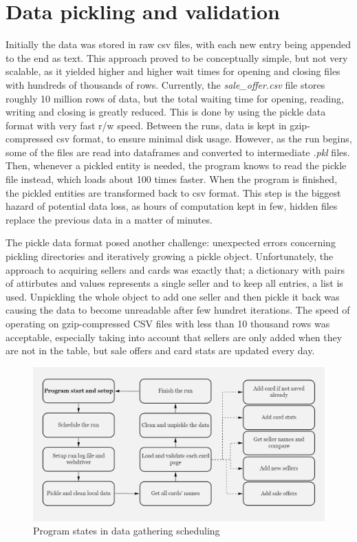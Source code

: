 \section{Data pickling and validation}
Initially the data was stored in raw csv files, with each new entry being appended to the end as text. This approach proved to be conceptually simple, but not very scalable, as it yielded higher and higher wait times for opening and closing files with hundreds of thousands of rows. Currently, the \textit{sale\_offer.csv} file stores roughly 10 million rows of data, but the total waiting time for opening, reading, writing and closing is greatly reduced. This is done by using the pickle data format with very fast r/w speed. Between the runs, data is kept in gzip-compressed csv format, to ensure minimal disk usage. However, as the run begins, some of the files are read into dataframes and converted to intermediate \textit{.pkl} files. Then, whenever a pickled entity is needed, the program knows to read the pickle file instead, which loads about 100 times faster. When the program is finished, the pickled entities are transformed back to csv format. This step is the biggest hazard of potential data loss, as hours of computation kept in few, hidden files replace the previous data in a matter of minutes. \par
The pickle data format posed another challenge: unexpected errors concerning pickling directories and iteratively growing a pickle object. Unfortunately, the approach to acquiring sellers and cards was exactly that; a dictionary with pairs of attirbutes and values represents a single seller and to keep all entries, a list is used. Unpickling the whole object to add one seller and then pickle it back was causing the data to become unreadable after few hundret iterations. The speed of operating on gzip-compressed CSV files with less than 10 thousand rows was acceptable, especially taking into account that sellers are only added when they are not in the table, but sale offers and card stats are updated every day. \par

\begin{figure}[ht]
      \centering
      \includegraphics[width=\textwidth]{figures/gathering_flow.png}
      \caption{Program states in data gathering scheduling}
      \label{fig:gathering_flow}
\end{figure}

